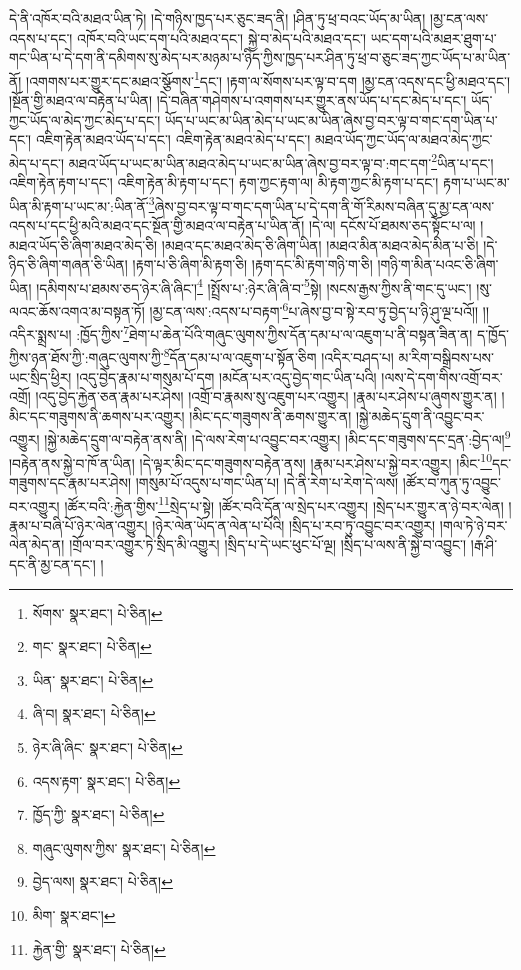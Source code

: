 དེ་ནི་འཁོར་བའི་མཐའ་ཡིན་ཏེ། །དེ་གཉིས་ཁྱད་པར་ཅུང་ཟད་ནི། །ཤིན་ཏུ་ཕྲ་བའང་ཡོད་མ་ཡིན། །མྱ་ངན་ལས་འདས་པ་དང་། འཁོར་བའི་ཡང་དག་པའི་མཐའ་དང་། སྐྱེ་བ་མེད་པའི་མཐའ་དང་། ཡང་དག་པའི་མཐར་ཐུག་པ་གང་ཡིན་པ་དེ་དག་ནི་དམིགས་སུ་མེད་པར་མཉམ་པ་ཉིད་ཀྱིས་ཁྱད་པར་ཤིན་ཏུ་ཕྲ་བ་ཅུང་ཟད་ཀྱང་ཡོད་པ་མ་ཡིན་ནོ། །འགགས་པར་གྱུར་དང་མཐའ་སྩོགས་\footnote{སོགས་  སྣར་ཐང་།  པེ་ཅིན། }དང་། །རྟག་ལ་སོགས་པར་ལྟ་བ་དག །མྱ་ངན་འདས་དང་ཕྱི་མཐའ་དང་། །སྔོན་གྱི་མཐའ་ལ་བརྟེན་པ་ཡིན། །དེ་བཞིན་གཤེགས་པ་འགགས་པར་གྱུར་ནས་ཡོད་པ་དང་མེད་པ་དང་། ཡོད་ཀྱང་ཡོད་ལ་མེད་ཀྱང་མེད་པ་དང་། ཡོད་པ་ཡང་མ་ཡིན་མེད་པ་ཡང་མ་ཡིན་ཞེས་བྱ་བར་ལྟ་བ་གང་དག་ཡིན་པ་དང་། འཇིག་རྟེན་མཐའ་ཡོད་པ་དང་། འཇིག་རྟེན་མཐའ་མེད་པ་དང་། མཐའ་ཡོད་ཀྱང་ཡོད་ལ་མཐའ་མེད་ཀྱང་མེད་པ་དང་། མཐའ་ཡོད་པ་ཡང་མ་ཡིན་མཐའ་མེད་པ་ཡང་མ་ཡིན་ཞེས་བྱ་བར་ལྟ་བ་:གང་དག་\footnote{གང་  སྣར་ཐང་།  པེ་ཅིན། }ཡིན་པ་དང་། འཇིག་རྟེན་རྟག་པ་དང་། འཇིག་རྟེན་མི་རྟག་པ་དང་། རྟག་ཀྱང་རྟག་ལ། མི་རྟག་ཀྱང་མི་རྟག་པ་དང་། རྟག་པ་ཡང་མ་ཡིན་མི་རྟག་པ་ཡང་མ་:ཡིན་ནོ་\footnote{ཡིན་  སྣར་ཐང་།  པེ་ཅིན། }ཞེས་བྱ་བར་ལྟ་བ་གང་དག་ཡིན་པ་དེ་དག་ནི་གོ་རིམས་བཞིན་དུ་མྱ་ངན་ལས་འདས་པ་དང་ཕྱི་མའི་མཐའ་དང་སྔོན་གྱི་མཐའ་ལ་བརྟེན་པ་ཡིན་ནོ། །དེ་ལ། དངོས་པོ་ཐམས་ཅད་སྟོང་པ་ལ། །མཐའ་ཡོད་ཅི་ཞིག་མཐའ་མེད་ཅི། །མཐའ་དང་མཐའ་མེད་ཅི་ཞིག་ཡིན། །མཐའ་མིན་མཐའ་མེད་མིན་པ་ཅི། །དེ་ཉིད་ཅི་ཞིག་གཞན་ཅི་ཡིན། །རྟག་པ་ཅི་ཞིག་མི་རྟག་ཅི། །རྟག་དང་མི་རྟག་གཉི་ག་ཅི། །གཉི་ག་མིན་པའང་ཅི་ཞིག་ཡིན། །དམིགས་པ་ཐམས་ཅད་ཉེར་ཞི་ཞིང་།\footnote{ཞི་བ།  སྣར་ཐང་།  པེ་ཅིན། } །སྤྲོས་པ་:ཉེར་ཞི་ཞི་བ་\footnote{ཉེར་ཞི་ཞིང་  སྣར་ཐང་།  པེ་ཅིན། }སྟེ། །སངས་རྒྱས་ཀྱིས་ནི་གང་དུ་ཡང་། །སུ་ལའང་ཆོས་འགའ་མ་བསྟན་ཏོ། །མྱ་ངན་ལས་:འདས་པ་བརྟག་\footnote{འདས་རྟག་  སྣར་ཐང་།  པེ་ཅིན། }པ་ཞེས་བྱ་བ་སྟེ་རབ་ཏུ་བྱེད་པ་ཉི་ཤུ་ལྔ་པའོ།། །།འདིར་སྨྲས་པ། :ཁྱོད་ཀྱིས་\footnote{ཁྱོད་ཀྱི་  སྣར་ཐང་།  པེ་ཅིན། }ཐེག་པ་ཆེན་པོའི་གཞུང་ལུགས་ཀྱིས་དོན་དམ་པ་ལ་འཇུག་པ་ནི་བསྟན་ཟིན་ན། ད་ཁྱོད་ཀྱིས་ཉན་ཐོས་ཀྱི་:གཞུང་ལུགས་ཀྱི་\footnote{གཞུང་ལུགས་ཀྱིས་  སྣར་ཐང་།  པེ་ཅིན། }དོན་དམ་པ་ལ་འཇུག་པ་སྟོན་ཅིག །འདིར་བཤད་པ། མ་རིག་བསྒྲིབས་པས་ཡང་སྲིད་ཕྱིར། །འདུ་བྱེད་རྣམ་པ་གསུམ་པོ་དག །མངོན་པར་འདུ་བྱེད་གང་ཡིན་པའི། །ལས་དེ་དག་གིས་འགྲོ་བར་འགྲོ། །འདུ་བྱེད་རྐྱེན་ཅན་རྣམ་པར་ཤེས། །འགྲོ་བ་རྣམས་སུ་འཇུག་པར་འགྱུར། །རྣམ་པར་ཤེས་པ་ཞུགས་གྱུར་ན། །མིང་དང་གཟུགས་ནི་ཆགས་པར་འགྱུར། །མིང་དང་གཟུགས་ནི་ཆགས་གྱུར་ན། །སྐྱེ་མཆེད་དྲུག་ནི་འབྱུང་བར་འགྱུར། །སྐྱེ་མཆེད་དྲུག་ལ་བརྟེན་ནས་ནི། །དེ་ལས་རེག་པ་འབྱུང་བར་འགྱུར། །མིང་དང་གཟུགས་དང་དྲན་:བྱེད་ལ།\footnote{བྱེད་ལས།  སྣར་ཐང་།  པེ་ཅིན། } །བརྟེན་ནས་སྐྱེ་བ་ཁོ་ན་ཡིན། །དེ་ལྟར་མིང་དང་གཟུགས་བརྟེན་ནས། །རྣམ་པར་ཤེས་པ་སྐྱེ་བར་འགྱུར། །མིང་\footnote{མིག་  སྣར་ཐང་། }དང་གཟུགས་དང་རྣམ་པར་ཤེས། །གསུམ་པོ་འདུས་པ་གང་ཡིན་པ། །དེ་ནི་རེག་པ་རེག་དེ་ལས། །ཚོར་བ་ཀུན་ཏུ་འབྱུང་བར་འགྱུར། །ཚོར་བའི་:རྐྱེན་གྱིས་\footnote{རྐྱེན་གྱི་  སྣར་ཐང་།  པེ་ཅིན། }སྲེད་པ་སྟེ། །ཚོར་བའི་དོན་ལ་སྲེད་པར་འགྱུར། །སྲེད་པར་གྱུར་ན་ཉེ་བར་ལེན། །རྣམ་པ་བཞི་པོ་ཉེར་ལེན་འགྱུར། །ཉེར་ལེན་ཡོད་ན་ལེན་པ་པོའི། །སྲིད་པ་རབ་ཏུ་འབྱུང་བར་འགྱུར། །གལ་ཏེ་ཉེ་བར་ལེན་མེད་ན། །གྲོལ་བར་འགྱུར་ཏེ་སྲིད་མི་འགྱུར། །སྲིད་པ་དེ་ཡང་ཕུང་པོ་ལྔ། །སྲིད་པ་ལས་ནི་སྐྱེ་བ་འབྱུང་། །རྒ་ཤི་དང་ནི་མྱ་ངན་དང་། །

